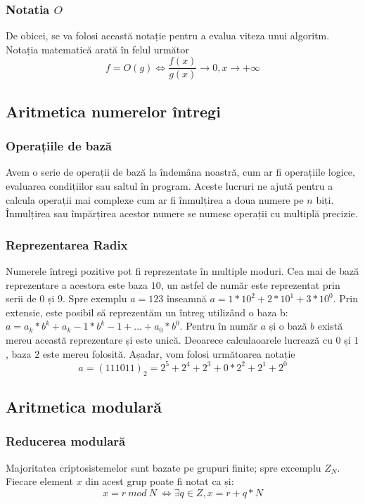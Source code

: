\documentclass[12]{report}
\begin{document}
     \subsubsection{Notatia $O$}
      De obicei, se va folosi această notație pentru a evalua viteza unui algoritm. Notația matematică arată 
      în felul următor \\
      $$ f = O(g) \Leftrightarrow \frac{f(x)}{g(x)} \longrightarrow 0 , x\longrightarrow +\infty $$
      
     \subsection{Aritmetica numerelor întregi}
      \subsubsection{Operațiile de bază}
       Avem o serie de operații de bază la îndemâna noastră, cum ar fi operațiile logice, evaluarea condițiilor sau saltul în program. Aceste lucruri ne ajută pentru a calcula operații mai complexe cum ar fi înmulțirea a doua numere pe $n$ biți. Înmulțirea sau împărțirea acestor numere se numesc operații cu multiplă precizie. 
      \subsubsection{Reprezentarea Radix}
      Numerele întregi pozitive pot fi reprezentate în multiple moduri. Cea mai de bază reprezentare a acestora este baza $10$, un astfel de număr este reprezentat prin serii de $0$ și $9$. Spre exemplu $ a = 123 $ înseamnă $ a = 1 * 10^2 + 2*10^1 + 3*10^0$. Prin extensie, este posibil să reprezentăm un întreg utilizând o baza b: $ a = a_k * b^k + a_k-1*b^k-1 + ... + a_0*b^0 $. Pentru în număr $a$ și o bază $b$ există mereu această reprezentare și este unică. Deoarece calculaoarele lucrează cu $0$ și $1$, baza $2$ este mereu folosită. Așadar, vom folosi următoarea notație \\
      $$ a=(111011)_2 = 2^5 + 2^4 + 2^3 + 0*2^2 + 2^1 + 2^0 $$
      \subsection{Aritmetica modulară}
       \subsubsection{Reducerea modulară}
        Majoritatea criptosistemelor sunt bazate pe grupuri finite; spre excemplu $ Z_N $. Fiecare element $x$ din acest grup poate fi notat ca și: \\
        $$ x = r  \ mod \ N \ \Leftrightarrow \exists q \in Z , x = r+q*N$$
\end{document}
